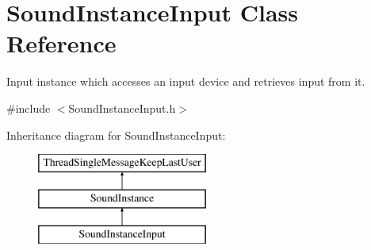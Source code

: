 \hypertarget{class_sound_instance_input}{
\section{SoundInstanceInput Class Reference}
\label{class_sound_instance_input}
}


Input instance which accesses an input device and retrieves input from it.  




{\ttfamily \#include $<$SoundInstanceInput.h$>$}

Inheritance diagram for SoundInstanceInput:\begin{figure}[H]
\begin{center}
\leavevmode
\includegraphics[height=3.000000cm]{class_sound_instance_input}
\end{center}
\end{figure}
